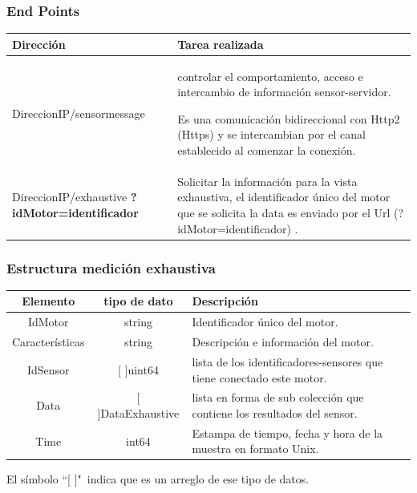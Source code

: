 \documentclass{beamer}
\begin{document}
\begin{frame}
    \frametitle{End Points}
    \begin{table}[H]
        \begin{center}
            \begin{tabular}{|p{4.2cm}|p{5.8cm}|}
                \hline
                Dirección       & Tarea realizada
                \\\hline\hline
                DireccionIP/sensormessage &
                controlar el comportamiento, acceso
                e intercambio de información sensor-servidor.

                Es una comunicación
                bidireccional con Http2 (Https) y se intercambian por el canal
                establecido al comenzar la conexión.
                \\\hline
                DireccionIP/exhaustive \textbf{?idMotor=identificador}   &
                Solicitar la información para la vista exhaustiva,
                el identificador único del motor que se solicita la data
                es enviado por el Url (?idMotor=identificador) .
                \\\hline
            \end{tabular}
        \end{center}
    \end{table}

\end{frame}

\begin{frame}
    \frametitle{Estructura medición exhaustiva}
    \begin{table}[ht]
        \begin{center}
            \begin{tabular}{|c|c|p{5cm}|}
                \hline
                Elemento        & tipo de dato & Descripción \\\hline\hline
                IdMotor         & string   & Identificador único del motor.\\\hline
                Características & string   & Descripción e información del motor.\\\hline
                IdSensor        & [ ]uint64 & lista de los identificadores-sensores
                que tiene conectado este motor.\\\hline
                Data            & [ ]DataExhaustive & lista en forma de sub colección
                que contiene los resultados del sensor.\\\hline
                Time            & int64  & Estampa de tiempo, fecha y hora de la muestra en formato Unix.\\\hline
            \end{tabular}

            \vspace{0.5cm}
            El símbolo ``[  ]"\  indica que es un arreglo de ese tipo de datos.
        \end{center}
    \end{table}
\end{frame}
\end{document}
